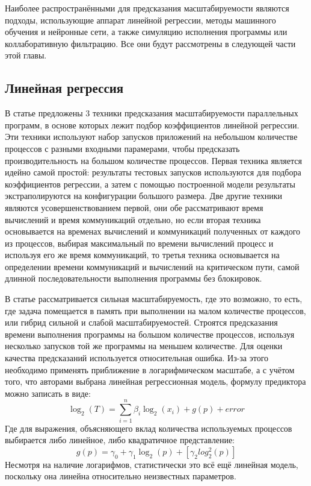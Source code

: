 	Наиболее распространёнными для предсказания масштабируемости являются подходы, использующие аппарат линейной регрессии, методы машинного обучения и нейронные сети, а также симуляцию исполнения программы или коллаборативную фильтрацию. Все они будут рассмотрены в следующей части этой главы.

	\subsection{Линейная регрессия}
		В статье \cite{log_main} предложены 3 техники предсказания масштабируемости параллельных программ, в основе которых лежит подбор коэффициентов линейной регрессии. Эти техники используют набор запусков приложений на небольшом количестве процессов с разными входными парамерами, чтобы предсказать производительность на большом количестве процессов. Первая техника является идейно самой простой: результаты тестовых запусков используются для подбора коэффициентов регрессии, а затем с помощью построенной модели результаты экстраполируются на конфигурации большого размера. Две другие техники являются усовершенствованием первой, они обе рассматривают время вычислений и время коммуникаций отдельно, но если вторая техника основывается на временах вычислений и коммуникаций полученных от каждого из процессов, выбирая максимальный по времени вычислений процесс и используя его же время коммуникаций, то третья техника основывается на определении времени коммуникаций и вычислений на критическом пути, самой длинной последовательности выполнения программы без блокировок.

		В статье рассматривается сильная масштабируемость, где это возможно, то есть, где задача помещается в память при выполнении на малом количестве процессов, или гибрид сильной и слабой масштабируемостей. Строятся предсказания времени выполнения программы на большом количестве процессов, используя несколько запусков той же программы на меньшем количестве. Для оценки качества предсказаний используется относительная ошибка. Из-за этого необходимо применять приближение в логарифмическом масштабе, а с учётом того, что авторами выбрана линейная регрессионная модель, формулу предиктора можно записать в виде:
		\[
		\log_2{(T)} = \sum_{i=1}^{n}{\beta_i\log_2{(x_i)}} + g(p) + error
		\]
		Где для выражения, объясняющего вклад количества используемых процессов выбирается либо линейное, либо квадратичное представление:
		\[
		g(p) = \gamma_0 + \gamma_1\log_2(p) + [\gamma_2log_2^2(p)]
		\]
		Несмотря на наличие логарифмов, статистически это всё ещё линейная модель, поскольку она линейна относительно неизвестных параметров.


